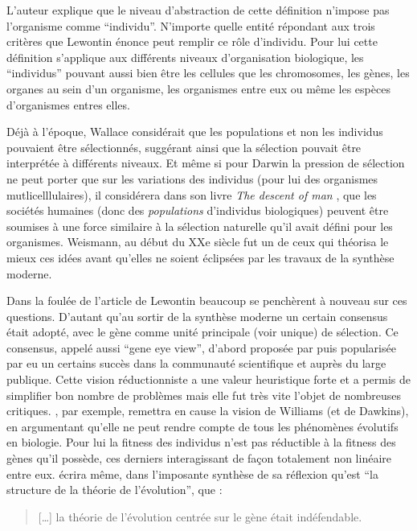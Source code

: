 \documentclass[a4paper,10pt]{article}
\begin{document}
L'auteur explique que le niveau d'abstraction de cette définition n'impose pas l'organisme comme ``individu''. N'importe quelle entité répondant aux trois critères que Lewontin énonce peut remplir ce rôle d'individu. Pour lui cette définition s'applique aux différents niveaux d'organisation biologique, les ``individus'' pouvant aussi bien être les cellules que les chromosomes, les gènes, les organes au sein d'un organisme, les organismes entre eux ou même les espèces d'organismes entres elles. 

Déjà à l'époque, Wallace considérait que les populations et non les individus pouvaient être sélectionnés, suggérant ainsi que la sélection pouvait être interprétée à différents niveaux. Et même si pour Darwin la pression de sélection ne peut porter que sur les variations des individus (pour lui des organismes mutlicelllulaires), il considérera dans son livre \emph{The descent of man} \citep{darwin1871thedescentofman}, que les sociétés humaines (donc des \emph{populations} d'individus biologiques) peuvent être soumises à une force similaire à la sélection naturelle qu'il avait défini pour les organismes. Weismann, au début du XXe siècle fut un de ceux qui théorisa le mieux ces idées avant qu'elles ne soient éclipsées par les travaux de la synthèse moderne.

Dans la foulée de l'article de Lewontin beaucoup se penchèrent à nouveau sur ces questions. D'autant qu'au sortir de la synthèse moderne un certain consensus était adopté, avec le gène comme unité principale (voir unique) de sélection. Ce consensus, appelé aussi ``gene eye view'', d'abord proposée par \cite{williams1966adaptationandnaturalselection} puis popularisée par \cite{dawkins76selfishgene} eu un certains succès dans la communauté scientifique et auprès du large publique. Cette vision réductionniste a une valeur heuristique forte et a permis de simplifier bon nombre de problèmes mais elle fut très vite l'objet de nombreuses critiques. \cite{wimsatt1980theunitsofselectionandthestructureofthemultilevelgenome}, par exemple, remettra en cause la vision de Williams (et de Dawkins), en argumentant qu'elle ne peut rendre compte de tous les phénomènes évolutifs en biologie. Pour lui la fitness des individus n'est pas réductible à la fitness des gènes qu'il possède, ces derniers interagissant de façon totalement non linéaire entre eux. \cite{gould2002thestructureofevolutionarytheory} écrira même, dans l'imposante synthèse de sa réflexion qu'est ``la structure de la théorie de l'évolution'', que :
\begin{quote}
	[\ldots] la théorie de l'évolution centrée sur le gène était indéfendable.\\
	\citep[p. 855]{gould2002thestructureofevolutionarytheory}
\end{quote}
\end{document}
